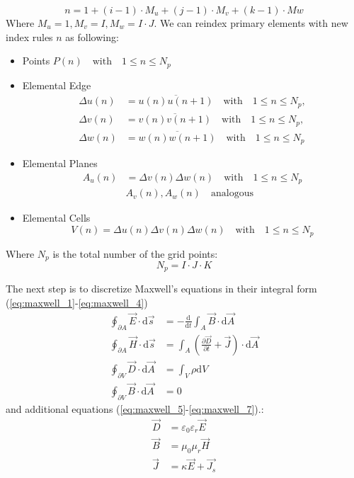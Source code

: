 \begin{equation}
n=1+(i-1)\cdot M_{u}+(j-1)\cdot M_{v}+(k-1)\cdot M{w}
\label{eq:discrete_index}
\end{equation}
Where $M_{u}=1,M_{v}=I,M_{w}=I\cdot J$. We can reindex primary elements with new index rules $n$ as following:
\begin{itemize}
\item Points $P(n) \quad \mathrm{with} \quad 1\leq n \leq N_{p}$
\item Elemental Edge
    \begin{align*}
		\Delta u(n)&=\overline{u(n)u(n+1)}  \quad \mathrm{with} \quad 1\leq n \leq N_{p}, \nonumber\\
		\Delta v(n)&=\overline{v(n)v(n+1)}  \quad \mathrm{with} \quad 1\leq n \leq N_{p}, \nonumber\\
		\Delta w(n)&=\overline{w(n)w(n+1)}  \quad \mathrm{with} \quad 1\leq n \leq N_{p}
		\end{align*}
\item Elemental Planes
		\begin{align*}
		A_{u}(n)&=\Delta v(n)\Delta w(n) \quad \mathrm{with} \quad 1\leq n\leq N_{p}\nonumber\\
		&A_{v}(n),A_{w}(n)  \quad \mathrm{analogous}
		\end{align*}
\item Elemental Cells
		\begin{equation*}
		V(n)=\Delta u(n)\Delta v(n)\Delta w(n)  \quad \mathrm{with} \quad 1\leq n\leq N_{p}
		\end{equation*}
\end{itemize}
Where $N_{p}$ is the total number of the grid points:
\begin{equation*}
N_{p}=I\cdot J\cdot K
\end{equation*}

The next step is to discretize Maxwell's equations in their integral form (\ref{eq:maxwell_1}-\ref{eq:maxwell_4}) 
\begin{align}
\oint_{\partial A}\vec{E}\cdot\mathrm{d}\vec{s}&=
-\frac{\mathrm{d}}{\mathrm{d}t}\int_{A}\vec{B}\cdot\mathrm{d}\vec{A}
\label{eq:maxwell_1}\\
\oint_{\partial A}\vec{H}\cdot\mathrm{d}\vec{s}&=
\int_{A}(\frac{\partial\vec{D}}{\partial t}+\vec{J})\cdot\mathrm{d}\vec{A}
\label{eq:maxwell_2}\\
\oint_{\partial V}\vec{D}\cdot\mathrm{d}\vec{A}&=
\int_{V}\rho\mathrm{d}V
\label{eq:maxwell_3}\\
\oint_{\partial V}\vec{B}\cdot\mathrm{d}\vec{A}&=0
\label{eq:maxwell_4}
\end{align}
and additional equations (\ref{eq:maxwell_5}-\ref{eq:maxwell_7}).:
\begin{align}
\vec{D}&=\varepsilon_{0}\varepsilon_{r}\vec{E}
\label{eq:maxwell_5}\\
\vec{B}&=\mu_{0}\mu_{r}\vec{H}
\label{eq:maxwell_6}\\
\vec{J}&=\kappa\vec{E}+\vec{J_{s}}
\label{eq:maxwell_7}
\end{align}
